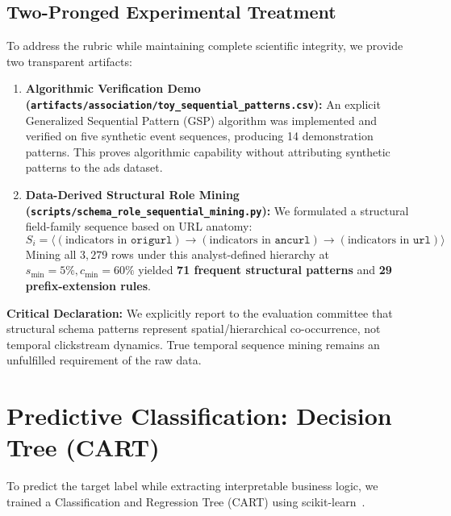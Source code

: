 \documentclass[11pt,a4paper]{article}
\begin{document}
\subsection{Two-Pronged Experimental Treatment}
To address the rubric while maintaining complete scientific integrity, we provide two transparent artifacts:
\begin{enumerate}[noitemsep,topsep=2pt]
    \item \textbf{Algorithmic Verification Demo (\texttt{artifacts/association/toy\_sequential\_patterns.csv}):} An explicit Generalized Sequential Pattern (GSP) algorithm was implemented and verified on five synthetic event sequences, producing 14 demonstration patterns. This proves algorithmic capability without attributing synthetic patterns to the ads dataset.
    \item \textbf{Data-Derived Structural Role Mining (\texttt{scripts/schema\_role\_sequential\_mining.py}):} We formulated a structural field-family sequence based on URL anatomy:
    \begin{equation}
    S_i = \langle (\text{indicators in } \texttt{origurl}) \longrightarrow (\text{indicators in } \texttt{ancurl}) \longrightarrow (\text{indicators in } \texttt{url}) \rangle
    \end{equation}
    Mining all $3{,}279$ rows under this analyst-defined hierarchy at $s_{\min}=5\%, c_{\min}=60\%$ yielded \textbf{71 frequent structural patterns} and \textbf{29 prefix-extension rules}.
\end{enumerate}

\noindent\textbf{Critical Declaration:} We explicitly report to the evaluation committee that structural schema patterns represent spatial/hierarchical co-occurrence, not temporal clickstream dynamics. True temporal sequence mining remains an unfulfilled requirement of the raw data.

\section{Predictive Classification: Decision Tree (CART)}
\label{sec:decision_tree}

To predict the target label while extracting interpretable business logic, we trained a Classification and Regression Tree (CART) using scikit-learn~\cite{scikitlearn2024,course_lecture13}.
\end{document}

